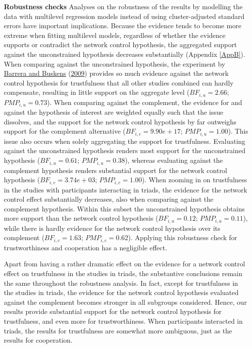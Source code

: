 \documentclass[
  11pt,
]{article}
\begin{document}
\textbf{Robustness checks} \hspace{8pt} Analyses on the robustness of the results by modelling the data with multilevel regression models instead of using cluster-adjusted standard errors have important implications.
Because the evidence tends to become more extreme when fitting multilevel models, regardless of whether the evidence supports or contradict the network control hypothesis, the aggregated support against the unconstrained hypothesis decreases substantially (Appendix \ref{AppB}).
When comparing against the unconstrained hypothesis, the experiment by \protect\hyperlink{ref-barrera_buskens_third_2009}{Barrera and Buskens} (\protect\hyperlink{ref-barrera_buskens_third_2009}{2009}) provides so much evidence against the network control hypothesis for trustfulness that all other studies combined can hardly compensate, resulting in little support on the aggregate level (\(BF_{i,u} = 2.66\); \(PMP_{i,u} = 0.73\)).
When comparing against the complement, the evidence for and against the hypothesis of interest are weighted equally such that the issue dissolves, and the support for the network control hypothesis by far outweighs support for the complement alternative (\(BF_{i,c} = 9.90e+17\); \(PMP_{i,u} = 1.00\)).
This issue also occurs when solely aggregating the support for trustfulness.
Evaluating against the unconstrained hypothesis renders most support for the unconstrained hypothesis (\(BF_{i,u} = 0.61\); \(PMP_{i,u} = 0.38\)), whereas evaluating against the complement hypothesis renders substantial support for the network control hypothesis (\(BF_{i,c} = 3.74e+03\); \(PMP_{i,c} = 1.00\)).
When zooming in on trustfulness in the studies with participants interacting in triads, the evidence for the network control effect substantially decreases, also when comparing against the complement hypothesis.
Within this subset the unconstrained hypothesis obtains more support than the network control hypothesis (\(BF_{i,u} = 0.12\); \(PMP_{i,u} = 0.11\)), while there is hardly evidence for the network control hypothesis over its complement (\(BF_{i,c} = 1.63\); \(PMP_{i,c} = 0.62\)).
Applying this robustness check for trustworthiness and cooperation has a negligible effect.

Apart from having a rather dramatic effect on the evidence for a network control effect on trustfulness in the studies in triads, the substantive conclusions remain the same throughout the robustness analysis.
In fact, except for trustfulness in the studies in triads, the evidence for the network control hypothesis evaluated against the complement becomes stronger in all subgroups considered.
Hence, our results provide substantial support for the network control hypothesis for trustfulness, and even more for trustworthiness.
When participants interacted in triads, the results for trustfulness are somewhat more ambiguous, just as the results for cooperation.
\end{document}
